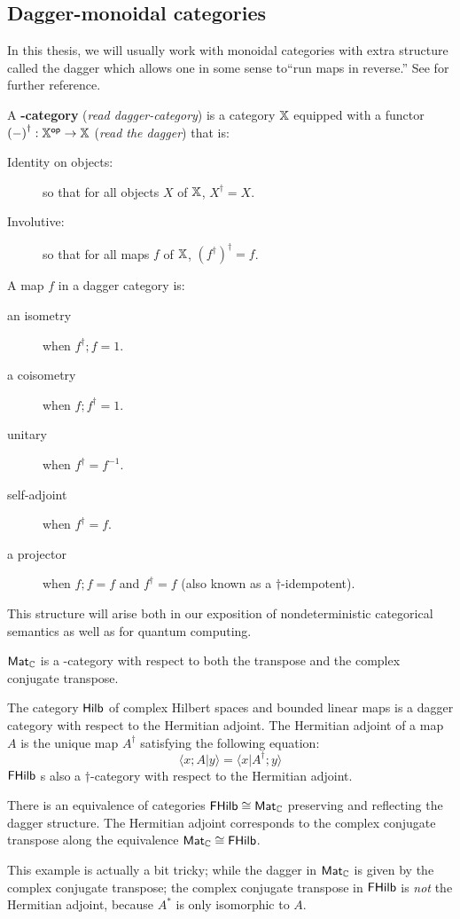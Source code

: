 \subsection{Dagger-monoidal categories}
\label{subsec:dag}
In this thesis, we will usually work with monoidal categories with extra structure called the dagger which allows one in some sense to``run maps in reverse.'' See \cite{cpm,abramsky} for further reference.
\begin{definition}
A {\bf \dag-category} ({\em read dagger-category}) is a category $\mathbb{X}$ equipped with a functor ${(-)}^\dag:\mathbb{X}^{\mathsf{op}}\to\mathbb{X}$ ({\em read the dagger}) that is:
\begin{description}
\item[Identity on objects:] so that for all objects $X$ of $\mathbb{X}$, $X^\dag = X$.
\item[Involutive:] so that for all maps $f$ of $\mathbb{X}$, $(f^\dag)^\dag = f$.
\end{description}
A map $f$ in a dagger category is:
\begin{description}
\item[an isometry] when $f^\dag; f = 1$.
\item[a coisometry] when $f; f^\dag = 1$.
\item[unitary] when $f^\dag = f^{-1}$.
\item[self-adjoint] when $f^\dag=f$.
\item[a projector]  when $f;f=f$ and $f^\dag=f$ (also known as a $\dag$-idempotent).
\end{description}
\end{definition}
This structure will arise both in our exposition of nondeterministic categorical semantics as well as for quantum computing.
\begin{example}
 $\mathsf{Mat}_{\mathbb{C}}$ is a \dag-category with respect to both the transpose and the complex conjugate transpose.
\end{example}
\begin{example}
The category $\mathsf{Hilb}$ of complex Hilbert spaces and bounded linear maps is a dagger category with respect to the Hermitian adjoint.  The Hermitian adjoint of a map $A$ is the unique map $A^\dag$ satisfying the following equation:
$$
\langle x;A|y\rangle = \langle x | A^\dag; y \rangle
$$
$\mathsf{FHilb}$  s also a $\dag$-category with respect to the Hermitian adjoint.
\end{example}
\begin{lemma}
There is an equivalence of categories $\mathsf{FHilb} \cong \mathsf{Mat}_{\mathbb{C}}$ preserving and reflecting the dagger structure.
The Hermitian adjoint corresponds to the complex conjugate transpose along the equivalence $\mathsf{Mat}_{\mathbb{C}} \cong \mathsf{FHilb}$.
\end{lemma}
This example is actually a bit tricky; while the dagger in $\mathsf{Mat}_{\mathbb{C}}$ is given by the complex conjugate transpose; the complex conjugate transpose in $\mathsf{FHilb}$ is {\em not } the Hermitian adjoint, because $A^*$ is only isomorphic to $A$.





